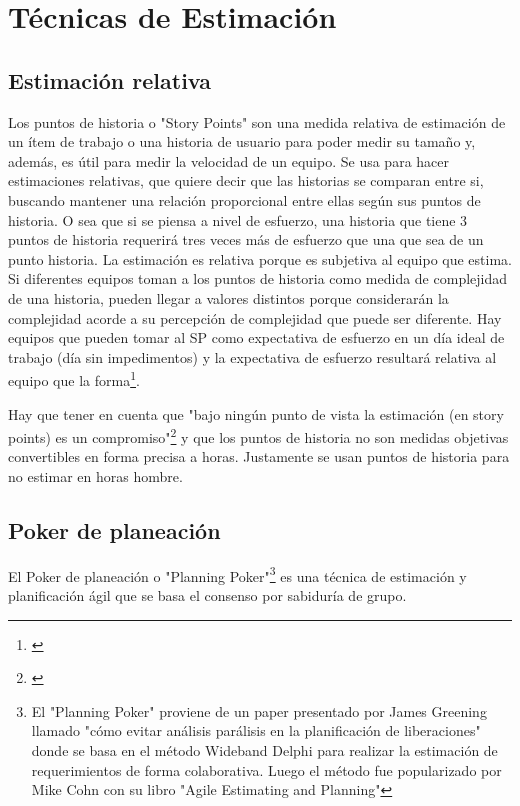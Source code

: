 \newpage
\section{Técnicas de Estimación}

\subsection{Estimación relativa}

Los puntos de historia o "Story Points" son una medida relativa de estimación de un ítem de trabajo o una historia de usuario para poder medir su tamaño y, además, es útil para medir la velocidad de un equipo. Se usa para hacer estimaciones relativas, que quiere decir que las historias se comparan entre si, buscando mantener una relación proporcional entre ellas según sus puntos de historia. O sea que si se piensa a nivel de esfuerzo, una historia que tiene 3 puntos de historia requerirá tres veces más de esfuerzo que una que sea de un punto historia.
La estimación es relativa porque es subjetiva al equipo que estima. Si diferentes equipos toman a los puntos de historia como medida de complejidad de una historia, pueden llegar a valores distintos porque considerarán la complejidad acorde a su percepción de complejidad que puede ser diferente. Hay equipos que pueden tomar al SP como expectativa de esfuerzo en un día ideal de trabajo (día sin impedimentos) y la expectativa de esfuerzo resultará relativa al equipo que la forma\footnote{\cite{Cohn-2004}}.

Hay que tener en cuenta que "bajo ningún punto de vista la estimación (en story points) es un compromiso"\footnote{\cite{UNTREF-2014}} y que los puntos de historia no son medidas objetivas convertibles en forma precisa a horas. Justamente se usan puntos de historia para no estimar en horas hombre.

\subsection{Poker de planeación}

El Poker de planeación o "Planning Poker"\footnote{El "Planning Poker" proviene de un paper presentado por James Greening llamado "cómo evitar análisis parálisis en la planificación de liberaciones"\cite{James-Grenning-2002} donde se basa en el método Wideband Delphi para realizar la estimación de requerimientos de forma colaborativa. Luego el método fue popularizado por Mike Cohn con su libro "Agile Estimating and Planning"\cite{Cohn-2005}} es una técnica de estimación y planificación ágil que se basa el consenso por sabiduría de grupo. 


